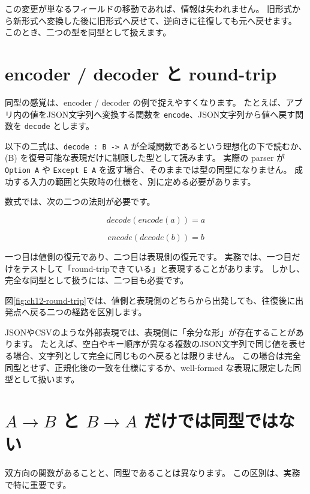 この変更が単なるフィールドの移動であれば、情報は失われません。
旧形式から新形式へ変換した後に旧形式へ戻せて、逆向きに往復しても元へ戻せます。
このとき、二つの型を同型として扱えます。

\section{encoder / decoder と round-trip}
\label{sec:ch12-round-trip}

同型の感覚は、encoder / decoder の例で捉えやすくなります。
たとえば、アプリ内の値をJSON文字列へ変換する関数を \texttt{encode}、JSON文字列から値へ戻す関数を \texttt{decode} とします。

以下の二式は、\texttt{decode : B -> A} が全域関数であるという理想化の下で読むか、(B) を復号可能な表現だけに制限した型として読みます。
実際の parser が \texttt{Option A} や \texttt{Except E A} を返す場合、そのままでは型の同型になりません。
成功する入力の範囲と失敗時の仕様を、別に定める必要があります。

数式では、次の二つの法則が必要です。

\[
  \mathit{decode}(\mathit{encode}(a)) = a
\]

\[
  \mathit{encode}(\mathit{decode}(b)) = b
\]

一つ目は値側の復元であり、二つ目は表現側の復元です。
実務では、一つ目だけをテストして「round-tripできている」と表現することがあります。
しかし、完全な同型として扱うには、二つ目も必要です。

図\ref{fig:ch12-round-trip}では、値側と表現側のどちらから出発しても、往復後に出発点へ戻る二つの経路を区別します。


JSONやCSVのような外部表現では、表現側に「余分な形」が存在することがあります。
たとえば、空白やキー順序が異なる複数のJSON文字列で同じ値を表せる場合、文字列として完全に同じものへ戻るとは限りません。
この場合は完全同型とせず、正規化後の一致を仕様にするか、well-formed な表現に限定した同型として扱います。

\section{\texorpdfstring{$A \to B$ と $B \to A$}{A to B と B to A} だけでは同型ではない}
\label{sec:ch12-bidirectional-is-not-enough}

双方向の関数があることと、同型であることは異なります。
この区別は、実務で特に重要です。

